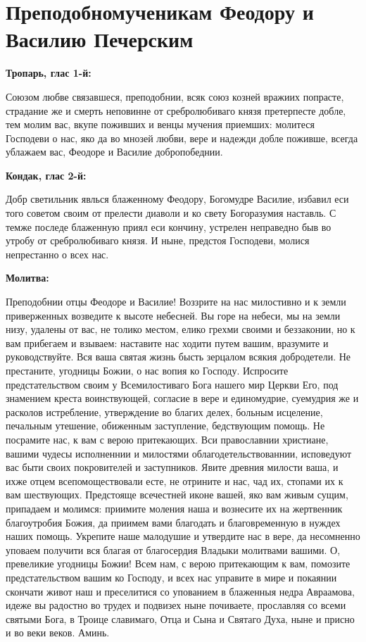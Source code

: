 \section{Преподобномученикам Феодору и Василию Печерским}
 


\bfseries Тропарь, глас 1-й:\normalfont{}


Союзом любве связавшеся, преподобнии, всяк союз козней вражиих попрасте, страдание же и смерть неповинне от сребролюбиваго князя претерпесте добле, тем молим вас, вкупе поживших и венцы мучения приемших: молитеся Господеви о нас, яко да во мнозей любви, вере и надежди добле поживше, всегда ублажаем вас, Феодоре и Василие добропобеднии.


\medskip


\bfseries Кондак, глас 2-й:\normalfont{}


Добр светильник явлься блаженному Феодору, Богомудре Василие, избавил еси того советом своим от прелести диаволи и ко свету Богоразумия наставль. С темже последе блаженную приял еси кончину, устрелен неправедно быв во утробу от сребролюбиваго князя. И ныне, предстоя Господеви, молися непрестанно о всех нас.


\medskip


\bfseries Молитва:\normalfont{}


Преподобнии отцы Феодоре и Василие! Воззрите на нас милостивно и к земли приверженных возведите к высоте небесней. Вы горе на небеси, мы на земли низу, удалены от вас, не толико местом, елико грехми своими и беззаконии, но к вам прибегаем и взываем: наставите нас ходити путем вашим, вразумите и руководствуйте. Вся ваша святая жизнь бысть зерцалом всякия добродетели. Не престаните, угодницы Божии, о нас вопия ко Господу. Испросите предстательством своим у Всемилостиваго Бога нашего мир Церкви Его, под знамением креста воинствующей, согласие в вере и единомудрие, суемудрия же и расколов истребление, утверждение во благих делех, больным исцеление, печальным утешение, обиженным заступление, бедствующим помощь. Не посрамите нас, к вам с верою притекающих. Вси православнии христиане, вашими чудесы исполненнии и милостями облагодетельствованнии, исповедуют вас быти своих покровителей и заступников. Явите древния милости ваша, и ихже отцем всепомоществовали есте, не отрините и нас, чад их, стопами их к вам шествующих. Предстояще всечестней иконе вашей, яко вам живым сущим, припадаем и молимся: приимите моления наша и вознесите их на жертвенник благоутробия Божия, да приимем вами благодать и благовременную в нуждех наших помощь. Укрепите наше малодушие и утвердите нас в вере, да несомненно уповаем получити вся благая от благосердия Владыки молитвами вашими. О, превеликие угодницы Божии! Всем нам, с верою притекающим к вам, помозите предстательством вашим ко Господу, и всех нас управите в мире и покаянии скончати живот наш и преселитися со упованием в блаженныя недра Авраамова, идеже вы радостно во трудех и подвизех ныне почиваете, прославляя со всеми святыми Бога, в Троице славимаго, Отца и Сына и Святаго Духа, ныне и присно и во веки веков. Аминь.


